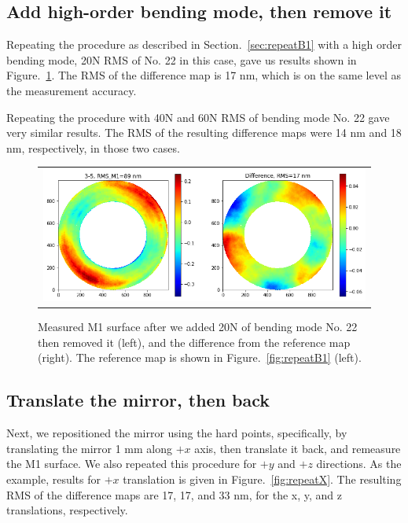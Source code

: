 \documentclass [twoside,openbib,12pt]{article}
\begin{document}
\subsection{Add high-order bending mode, then remove it}

Repeating the procedure as described in Section.~\ref{sec:repeatB1}
with a high order bending mode, 20N RMS of No. 22 in this case, gave
us results shown in Figure.~\ref{fig:repeatB22}.
The RMS of the difference map is 17
nm, which is on the same level as the measurement accuracy.

Repeating the procedure with 40N and 60N RMS of bending mode No. 22
gave very similar results. The RMS of the resulting difference maps
were 14 nm and 18 nm, respectively, in those two cases.

 \begin{figure}[bthp]
   \begin{center}
   \begin{tabular}{c}
\includegraphics[width=120mm]{figures/repeatB22.png}
  \end{tabular}
   \end{center}
   \caption
  { \label{fig:repeatB22}
Measured M1 surface after we added 20N of bending mode No. 22 then
removed it (left), and the difference from the reference map
(right). The reference map is shown in Figure.~\ref{fig:repeatB1} (left).
 }
\end{figure}

\subsection{Translate the mirror, then back}

Next, we repositioned the mirror using the hard points, specifically,
by translating the mirror 1 mm along $+x$ axis, then translate it
back, and remeasure the M1 surface. We also repeated this procedure
for $+y$ and $+z$ directions. As the example, results for $+x$
translation is given in Figure.~\ref{fig:repeatX}.
The resulting RMS of the difference maps are 17, 17, and 33
nm, for the x, y, and z translations, respectively.
\end{document}
